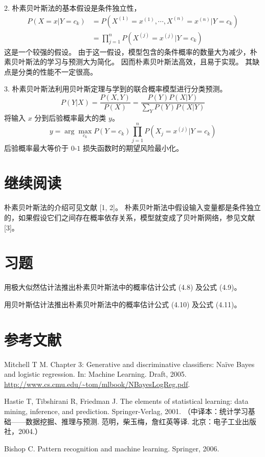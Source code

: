 \documentclass[UTF8,12pt,a4paper,fontset=fandol]{ctexart}
\begin{document}
2. 朴素贝叶斯法的基本假设是条件独立性，
\[
\begin{aligned}
  P(X=x|Y=c_k)
  &=P(X^{(1)}=x^{(1)},\cdots,X^{(n)}=x^{(n)}|Y=c_k)\\
  &=\prod_{j=1}^n P(X^{(j)}=x^{(j)}|Y=c_k)
\end{aligned}
\]
这是一个较强的假设。
由于这一假设，模型包含的条件概率的数量大为减少，朴素贝叶斯法的学习与预测大为简化。
因而朴素贝叶斯法高效，且易于实现。
其缺点是分类的性能不一定很高。

3. 朴素贝叶斯法利用贝叶斯定理与学到的联合概率模型进行分类预测。
\[
  P(Y|X)=\frac{P(X,Y)}{P(X)}
  =
  \frac{P(Y)P(X|Y)}{\sum_Y P(Y)P(X|Y)}
\]
将输入 $x$ 分到后验概率最大的类 $y$。
\[
  y=\arg\max_{c_k}P(Y=c_k)\prod_{j=1}^n P(X_j=x^{(j)}|Y=c_k)
\]
后验概率最大等价于 $0$-$1$ 损失函数时的期望风险最小化。

\section*{继续阅读}

朴素贝叶斯法的介绍可见文献 [1, 2]。
朴素贝叶斯法中假设输入变量都是条件独立的，如果假设它们之间存在概率依存关系，模型就变成了贝叶斯网络，参见文献 [3]。

\section*{习题}

\quad 用极大似然估计法推出朴素贝叶斯法中的概率估计公式 (4.8) 及公式 (4.9)。

\quad 用贝叶斯估计法推出朴素贝叶斯法中的概率估计公式 (4.10) 及公式 (4.11)。

\section*{参考文献}

\noindent [1]\quad Mitchell T M. Chapter 3: Generative and discriminative classifiers: Naïve Bayes and logistic regression. In: Machine Learning. Draft, 2005. \url{http://www.cs.cmu.edu/~tom/mlbook/NBayesLogReg.pdf}.

\noindent [2]\quad Hastie T, Tibshirani R, Friedman J. The elements of statistical learning: data mining, inference, and prediction. Springer-Verlag, 2001. （中译本：统计学习基础——数据挖掘、推理与预测. 范明，柴玉梅，詹红英等译. 北京：电子工业出版社，2004.）

\noindent [3]\quad Bishop C. Pattern recognition and machine learning. Springer, 2006.
\end{document}
